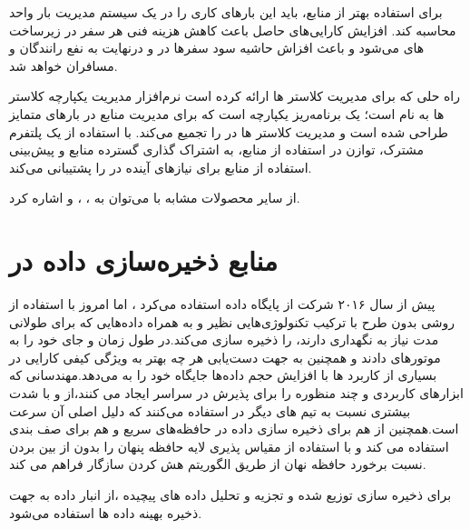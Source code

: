 برای استفاده بهتر از منابع، باید این بارهای کاری را در یک سیستم مدیریت بار واحد محاسبه کند. افزایش کارایی‌های حاصل باعث کاهش هزینه فنی هر سفر در زیرساخت های  می‌شود و باعث افزاش حاشیه سود سفر‌ها در  و درنهایت به نفع رانندگان و مسافران خواهد شد.

راه حلی که  برای مدیریت کلاستر ها ارائه کرده است نرم‌افزار مدیریت یکپارچه کلاستر ها به نام  است\cite{resource_uber}؛  یک برنامه‌ریز یکپارچه است که برای مدیریت منابع در بارهای متمایز طراحی شده است و مدیریت کلاستر ها در  را تجمیع می‌کند.  با استفاده از یک پلتفرم مشترک، توازن در استفاده از منابع، به اشتراک گذاری گسترده منابع و پیش‌بینی استفاده از منابع برای نیازهای آینده در  را پشتیبانی می‌کند.

از سایر محصولات مشابه با  می‌توان به \cite{verma2015large} ،\cite{kubernetes} ، \cite{hadoop} و \cite{aurora}\cite{mesos} اشاره کرد.

\section{منابع ذخیره‌سازی داده در }
پیش از سال ۲۰۱۶ شرکت  از پایگاه داده  استفاده می‌کرد \cite{migration_postgres}، اما امروز با استفاده از روشی بدون طرح\cite{schemaless}  با ترکیب تکنولوژی‌هایی نظیر \cite{riak} و \cite{cassandra} به همراه    داده‌هایی که برای طولانی مدت نیاز به نگهداری دارند، را ذخیره سازی می‌کند.در طول زمان  و  جای خود را به موتور‌‌های  دادند و همچنین به جهت دست‌یابی هر چه بهتر به ویژگی کیفی کارایی در بسیاری از کاربرد ها با افزایش حجم داده‌ها  جایگاه خود را به  می‌دهد.مهندسانی که ابزارهای کاربردی و چند منظوره را برای پذیرش در سراسر  ایجاد می کنند،از  و  با شدت بیشتری نسبت به تیم های دیگر در  استفاده می‌کنند که دلیل اصلی آن سرعت است.همچنین  از \cite{redis}  هم برای ذخیره سازی داده در حافظه‌های سریع و هم برای صف بندی استفاده می کند و با استفاده از \cite{Twemproxy} مقیاس پذیری لایه حافظه پنهان را بدون از بین بردن نسبت برخورد حافظه نهان از طریق الگوریتم هش کردن سازگار فراهم می کند.

برای ذخیره سازی توزیع شده و تجزیه و تحلیل داده های پیچیده ،از انبار داده \cite{hadoop} به جهت ذخیره بهینه داده ها استفاده می‌شود.

